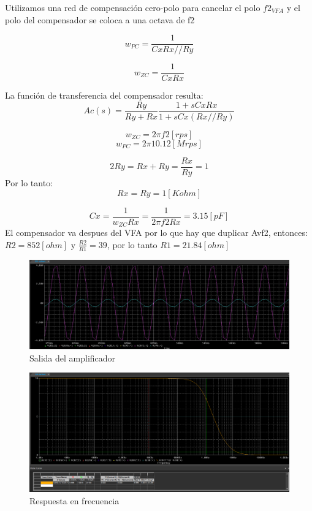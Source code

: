 \documentclass[12pt]{article}
\begin{document}
	Utilizamos una red de compensación cero-polo para cancelar el polo $f2_{VFA}$ y el polo del compensador se coloca a una octava de f2
	
	\begin{equation}
		w_{PC}=\frac{1}{Cx Rx//Ry}
	\end{equation}
	
	\begin{equation}
		w_{ZC}=\frac{1}{Cx Rx}
	\end{equation}
	
	La función de transferencia del compensador resulta:
	\begin{equation}
		Ac(s)=\frac{Ry}{Ry+Rx}\frac{1+sCxRx}{1+sCx(Rx//Ry)}
	\end{equation}
	
	\begin{equation}
			w_{ZC}=2 \pi f2[rps]
	\end{equation}
	\begin{equation}
		w_{PC}=2 \pi 10.12[Mrps]
	\end{equation}
	
	\begin{equation}
		2Ry=Rx+Ry=\frac{Rx}{Ry}=1
	\end{equation}
	Por lo tanto:
	\begin{equation}
		Rx=Ry=1[Kohm]
	\end{equation}
	
	\begin{equation}
		Cx=\frac{1}{w_{ZC}Rx}=\frac{1}{2 \pi f2 Rx}=3.15[pF]
	\end{equation}
	El compensador va despues del VFA por lo que hay que duplicar Avf2, entonces: $R2=852[ohm]$ y $\frac{R2}{R1}=39$, por lo tanto $R1=21.84[ohm]$
	
	\begin{figure}[h!]
		\includegraphics[width=1\linewidth]{Simulaciones_Imagenes/1.C_Sim_gain}
		\caption[Salida del amplificador]{Salida del amplificador}
		\label{fig:8}
	\end{figure}
	
	\begin{figure}[h!]
		\includegraphics[width=1\linewidth]{Simulaciones_Imagenes/1.C_Frec_Resp}
		\caption[Respuesta en frecuencia]{Respuesta en frecuencia}
		\label{fig:9}
	\end{figure}
	
	
	
	
\end{document}
